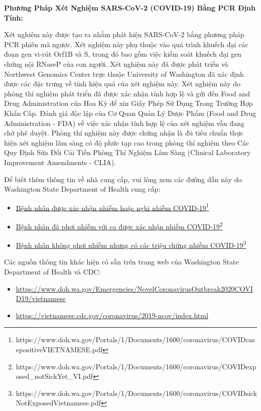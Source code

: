 \documentclass[10pt]{article}
\newcommand{\link}[2]{\href{#1}{#2}\footnote{#1}}
\begin{document}
\bigskip
\textbf{Phương Pháp Xét Nghiệm SARS-CoV-2 (COVID-19) Bằng PCR Định Tính:}

Xét nghiệm này được tạo ra nhằm phát hiện SARS-CoV-2 bằng phương pháp PCR phiên
mã ngược. Xét nghiệm này phụ thuộc vào quá trình khuếch đại các đoạn gen vi-rút
Orf1B và S, trong đó bao gồm việc kiểm soát khuếch đại gen chứng nội RNaseP của
con người. Xét nghiệm này đã được phát triển và Northwest Genomics Center trực
thuộc University of Washington đã xác định được các đặc trưng về tính hiệu quả
của xét nghiệm này. Xét nghiệm này do phòng thí nghiệm phát triển đã được xác
nhận tính hợp lệ và gửi đến Food and Drug Administration của Hoa Kỳ để xin Giấy
Phép Sử Dụng Trong Trường Hợp Khẩn Cấp. Đánh giá độc lập của Cơ Quan Quản Lý
Dược Phẩm (Food and Drug Administration - FDA) về việc xác nhận tính hợp lệ của
xét nghiệm vẫn đang chờ phê duyệt. Phòng thí nghiệm này được chứng nhận là đủ
tiêu chuẩn thực hiện xét nghiệm lâm sàng có độ phức tạp cao trong phòng thí
nghiệm theo Các Quy Định Sửa Đổi Cải Tiến Phòng Thí Nghiệm Lâm Sàng (Clinical
Laboratory Improvement Amendments - CLIA).

Để biết thêm thông tin về nhà cung cấp, vui lòng xem các đường dẫn này do
Washington State Department of Health cung cấp:

\begin{itemize}
\item

  \link{https://www.doh.wa.gov/Portals/1/Documents/1600/coronavirus/COVIDcasepositiveVIETNAMESE.pdf}{Bệnh
  nhân được xác nhận nhiễm hoặc nghi nhiễm COVID-19}

\item

  \link{https://www.doh.wa.gov/Portals/1/Documents/1600/coronavirus/COVIDexposed\_notSickYet\_VI.pdf}{Bệnh
  nhân đã phơi nhiễm với ca được xác nhận nhiễm COVID-19}

\item

  \link{https://www.doh.wa.gov/Portals/1/Documents/1600/coronavirus/COVIDsickNotExposedVietnamese.pdf}{Bệnh
  nhân không phơi nhiễm nhưng có các triệu chứng nhiễm COVID-19}

\end{itemize}

Các nguồn thông tin khác hiện có sẵn trên trang web của Washington State
Department of Health và CDC:

\begin{itemize}
\item

  \url{https://www.doh.wa.gov/Emergencies/NovelCoronavirusOutbreak2020COVID19/vietnamese}

\item

  \url{https://vietnamese.cdc.gov/coronavirus/2019-ncov/index.html}

\end{itemize}
\end{document}
